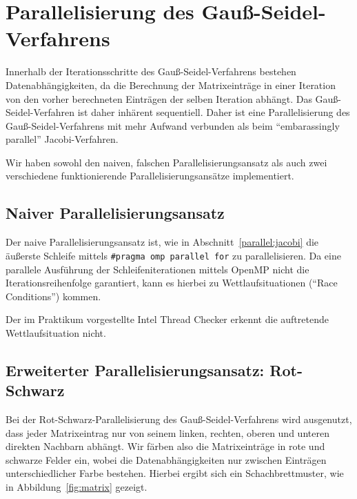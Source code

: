 \documentclass{article}
\begin{document}
\newpage

\section{Parallelisierung des Gauß-Seidel-Verfahrens}

Innerhalb der Iterationsschritte des Gauß-Seidel-Verfahrens bestehen Datenabhängigkeiten, da die Berechnung der Matrixeinträge in einer Iteration von den vorher berechneten Einträgen der selben Iteration abhängt. Das Gauß-Seidel-Verfahren ist daher inhärent sequentiell. Daher ist eine Parallelisierung des Gauß-Seidel-Verfahrens mit mehr Aufwand verbunden als beim ``embarassingly parallel'' Jacobi-Verfahren.

Wir haben sowohl den naiven, falschen Parallelisierungsansatz als auch zwei verschiedene funktionierende Parallelisierungsansätze implementiert.

\subsection{Naiver Parallelisierungsansatz}\label{gs:naiv}
Der naive Parallelisierungsansatz ist, wie in Abschnitt~\ref{parallel:jacobi} die äußerste Schleife mittels \texttt{\#pragma omp parallel for} zu parallelisieren. Da eine parallele Ausführung der Schleifeniterationen mittels OpenMP nicht die Iterationsreihenfolge garantiert, kann es hierbei zu Wettlaufsituationen (``Race Conditions'') kommen.

Der im Praktikum vorgestellte Intel Thread Checker erkennt die auftretende Wettlaufsituation nicht.


\subsection{Erweiterter Parallelisierungsansatz: Rot-Schwarz}

Bei der Rot-Schwarz-Parallelisierung des Gauß-Seidel-Verfahrens wird ausgenutzt, dass jeder Matrixeintrag nur von seinem linken, rechten, oberen und unteren direkten Nachbarn abhängt. Wir färben also die Matrixeinträge in rote und schwarze Felder ein, wobei die Datenabhängigkeiten nur zwischen Einträgen unterschiedlicher Farbe bestehen. Hierbei ergibt sich ein Schachbrettmuster, wie in Abbildung~\ref{fig:matrix} gezeigt.
\end{document}
